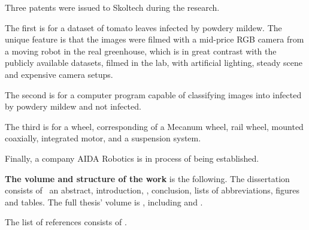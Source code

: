 Three patents were issued to Skoltech during the research.

The first is for a dataset of tomato leaves infected by powdery mildew. The unique feature is that the images were filmed with a mid-price RGB camera from a moving robot in the real greenhouse, which is in great contrast with the publicly available datasets, filmed in the lab, with artificial lighting, steady scene and expensive camera setups.

The second is for a computer program capable of classifying images into infected by powdery mildew and not infected.

The third is for a wheel, corresponding of a Mecanum wheel, rail wheel, mounted coaxially, integrated motor, and a suspension system.

Finally, a company AIDA Robotics is in process of being established.

\textbf{The volume and structure of the work } is the following. 
The dissertation consists of ~an abstract, introduction,
,
conclusion, lists of abbreviations, figures and tables.
The full thesis' volume is
, including
 and
.

The list of references consists of .